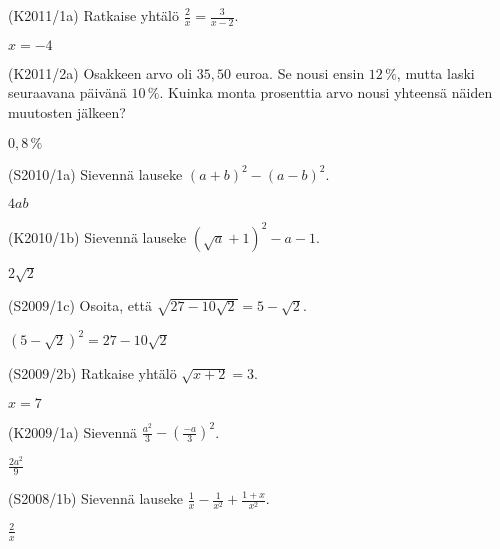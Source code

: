 \begin{multicols}{2}
\begin{tehtava}(K2011/1a) Ratkaise yhtälö $\frac{2}{x} = \frac{3}{x - 2}$.
	\begin{vastaus}
				$x=-4$
	\end{vastaus}
\end{tehtava}

\begin{tehtava}(K2011/2a) Osakkeen arvo oli $35,50$ euroa. Se nousi ensin $12\,\%$, mutta laski seuraavana päivänä $10\,\%$. Kuinka monta prosenttia arvo nousi yhteensä näiden muutosten jälkeen?
	\begin{vastaus}
	$0,8\,\%$
	\end{vastaus}
\end{tehtava}

\begin{tehtava}(S2010/1a) Sievennä lauseke $(a + b)^2 - (a - b)^2$.
	\begin{vastaus}
				$4ab$
	\end{vastaus}
\end{tehtava}

\begin{tehtava}(K2010/1b) Sievennä lauseke $ (\sqrt{a} + 1)^2 - a - 1 $.
	\begin{vastaus}
				$2\sqrt{2}$
	\end{vastaus}
\end{tehtava}

\begin{tehtava}(S2009/1c) Osoita, että $\sqrt{27 - 10 \sqrt{2}} = 5 - \sqrt{2} $.
	\begin{vastaus}
				$(5-\sqrt{2})^2=27-10\sqrt{2}$ %
	\end{vastaus}
\end{tehtava}

\begin{tehtava}(S2009/2b) Ratkaise yhtälö $ \sqrt{x + 2 } = 3$.
	\begin{vastaus}
				$x=7$
	\end{vastaus}
\end{tehtava}

\begin{tehtava}(K2009/1a) Sievennä $ \frac{a^2}{3} - \left( \frac{-a}{3} \right)^2 $.
	\begin{vastaus}
				$\frac{2a^2}{9}$
	\end{vastaus}
\end{tehtava}

\begin{tehtava}(S2008/1b) Sievennä lauseke $\frac{1}{x} - \frac{1}{x^2} + \frac{1 + x}{x^2}$.
	\begin{vastaus}
				$\frac{2}{x}$
	\end{vastaus}
\end{tehtava}


\end{multicols}
